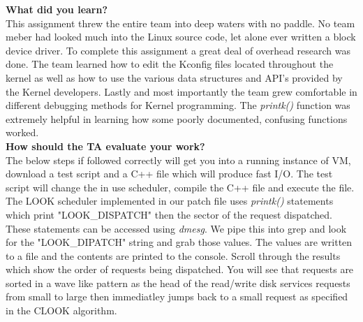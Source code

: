 \documentclass[10pt,onecolumn,draftclsnofoot]{IEEEtran} %
\begin{document}
\begin{singlespace}
\newpage
        \textbf{What did you learn?}\\
        \normalfont \indent This assignment threw the entire team into deep waters with no paddle. No team meber had looked much into the Linux source code, let alone ever written a block device driver. To complete this assignment a great deal of overhead research was done. The team learned how to edit the Kconfig files located throughout the kernel as well as how to use the various data structures and API's provided by the Kernel developers. Lastly and most importantly the team grew comfortable in different debugging methods for Kernel programming. The \textit{printk()} function was extremely helpful in learning how some poorly documented, confusing functions worked.\\

        \textbf{How should the TA evaluate your work?}\\
        
	\normalfont \indent The below steps if followed correctly will get you into a running instance of VM, download a test script and a C++ file which will produce fast I/O. The test script will change the in use scheduler, compile the C++ file and execute the file. The LOOK scheduler implemented in our patch file uses \textit{printk()} statements which print "LOOK\_DISPATCH" then the sector of the request dispatched. These statements can be accessed using \textit{dmesg}. We pipe this into grep and look for the "LOOK\_DIPATCH" string and grab those values. The values are written to a file and the contents are printed to the console. Scroll through the results which show the order of requests being dispatched. You will see that requests are sorted in a wave like pattern as the head of the read/write disk services requests from small to large then immediatley jumps back to a small request as specified in the CLOOK algorithm.\\



\end{singlespace}
\end{document}
